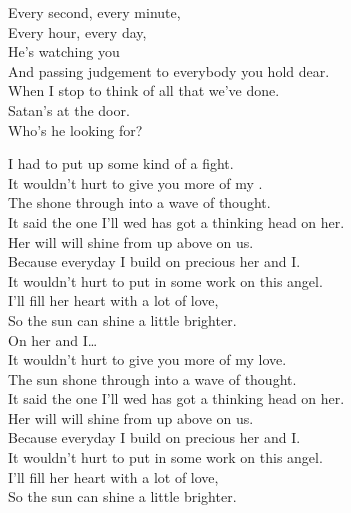 Every second, every minute, \\
Every hour, every day, \\
He's watching you \\
And passing judgement to everybody you hold dear. \\
When I stop to think of all that we've done. \\
Satan's at the door. \\
Who's he looking for? \\





I had to put up some kind of a fight. \\
It wouldn't hurt to give you more of my . \\
The  shone through into a wave of thought. \\
It said the one I'll wed has got a thinking head on her. \\

Her will will shine from up above on us. \\
Because everyday I build on precious her and I. \\
It wouldn't hurt to put in some work on this angel. \\
I'll fill her heart with a lot of love, \\
So the sun can shine a little brighter. \\

On her and I… \\

It wouldn't hurt to give you more of my love. \\
The sun shone through into a wave of thought. \\
It said the one I'll wed has got a thinking head on her. \\
Her will will shine from up above on us. \\

Because everyday I build on precious her and I. \\
It wouldn't hurt to put in some work on this angel. \\
I'll fill her heart with a lot of love, \\
So the sun can shine a little brighter. \\

